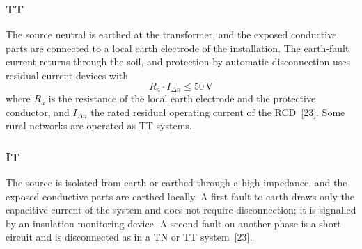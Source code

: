\subsubsection{TT}
The source neutral is earthed at the transformer, and the exposed
conductive parts are connected to a local earth electrode of the
installation. The earth-fault current returns through the soil, and
protection by automatic disconnection uses residual current devices with
\begin{equation}
  R_{a} \cdot I_{\Delta n} \le 50\,\mathrm{V}
  \label{eq:de-tt}
\end{equation}
where $R_{a}$ is the resistance of the local earth electrode and the
protective conductor, and $I_{\Delta n}$ the rated residual operating
current of the RCD~[23]. Some rural networks are operated as TT
systems.

\subsubsection{IT}
The source is isolated from earth or earthed through a high impedance, and
the exposed conductive parts are earthed locally. A first fault to earth
draws only the capacitive current of the system and does not require
disconnection; it is signalled by an insulation monitoring device. A
second fault on another phase is a short circuit and is disconnected as in
a TN or TT system~[23].
\FloatBarrier
